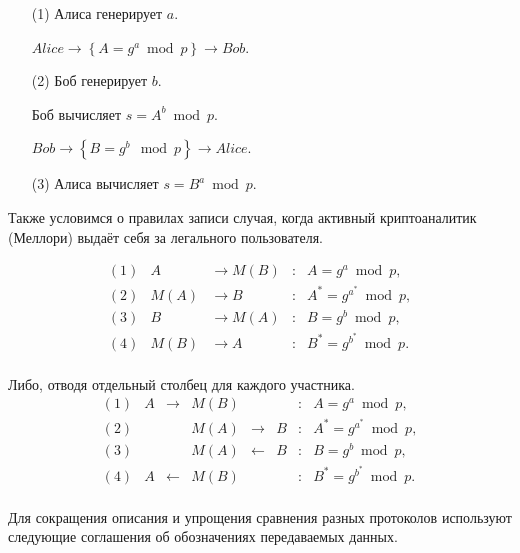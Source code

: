 \begin{enumerate}
	\item[(1)] Алиса генерирует $a$.
	\item[] $Alice \to \left\{ A = g^a \bmod p \right\} \to Bob$.
	\item[(2)] Боб генерирует $b$.
	\item[] Боб вычисляет $s = A^b \bmod p$.
	\item[] $Bob \to \left\{ B = g^b \mod p \right\} \to Alice$.
	\item[(3)] Алиса вычисляет $s = B^a \bmod p$.
\end{enumerate}

Также условимся о правилах записи случая, когда активный криптоаналитик (Меллори) выдаёт себя за легального пользователя.

\[
\begin{array}{llllc}
(1) & A                & \to M \left(B\right) & : & A   = g^a     \bmod p, \\ 
(2) & M \left(A\right) & \to B                & : & A^* = g^{a^*} \bmod p, \\ 
(3) & B                & \to M \left(A\right) & : & B   = g^b     \bmod p, \\ 
(4) & M \left(B\right) & \to A                & : & B^* = g^{b^*} \bmod p. \\
\end{array}
\]

Либо, отводя отдельный столбец для каждого участника.
\[
\begin{array}{lllclllc}
	(1) & A  & \to   & M \left(B\right) & {}    & {} & : & A = g^a     \bmod p, \\ 
	(2) & {} & {}    & M \left(A\right) & \to   & B  & : & A^* = g^{a^*} \bmod p, \\ 
	(3) & {} & {}    & M \left(A\right) & \gets & B  & : & B   = g^b     \bmod p, \\ 
	(4) & A  & \gets & M \left(B\right) & {}    & {} & : & B^* = g^{b^*} \bmod p. \\
\end{array}
\]

Для сокращения описания и упрощения сравнения разных протоколов используют следующие соглашения об обозначениях передаваемых данных.

